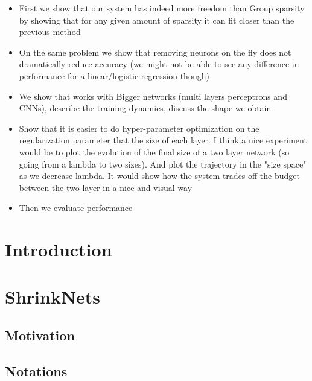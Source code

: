 \documentclass{article}
\begin{document}
\begin{itemize}
  \item First we show that our system has indeed more freedom than Group sparsity by showing that for any given amount of sparsity it can fit closer than the previous method
  \item On the same problem we show that removing neurons on the fly does not dramatically reduce accuracy (we might not be able to see any difference in performance for a linear/logistic regression though)
  \item We show that works with Bigger networks (multi layers perceptrons and CNNs), describe the training dynamics, discuss the shape we obtain
  \item Show that it is easier to do hyper-parameter optimization on the regularization parameter that the size of each layer. I think a nice experiment would be to plot the evolution of the final size of a two layer network (so going from a lambda to two sizes). And plot the trajectory in the "size space" as we decrease lambda. It would show how the system trades off the budget between the two layer in a nice and visual way
  \item Then we evaluate performance
\end{itemize}

\section{Introduction}

\section{ShrinkNets}

\subsection{Motivation}

\subsection{Notations}
\end{document}
